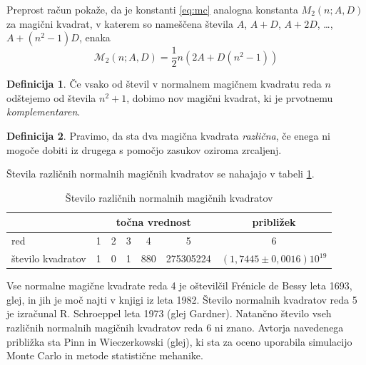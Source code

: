 \documentclass[a4paper,12pt]{article}
\theoremstyle{definition}
\newtheorem{definicija}{Definicija}
\theoremstyle{plain}
\begin{document}
Preprost račun pokaže, da je konstanti \eqref{eq:mc} analogna konstanta
\(M_2(n;A,D)\) za magični kvadrat, v katerem so nameščena števila
\(A\), \(A+D\), \(A+2D\), \ldots, \(A+(n^2-1)D\), enaka %
\[\mathcal{M}_2(n;A,D)=\frac{1}{2}n(2A+D(n^2-1))\]

      
      \begin{definicija}
         Če vsako od števil v normalnem magičnem kvadratu reda \(n\) odštejemo
         od števila \(n^2+1\), dobimo nov magični kvadrat, ki je prvotnemu
         \emph{komplementaren}.
      \end{definicija}

      
      \begin{definicija}
         Pravimo, da sta dva magična kvadrata \emph{različna}, če enega ni mogoče dobiti
         iz drugega s pomočjo zasukov oziroma zrcaljenj.
      \end{definicija}

Števila različnih normalnih magičnih kvadratov se nahajajo v tabeli \ref{table:stevila}.


\begin{table}[!ht]
\centering
\caption{Število različnih normalnih magičnih kvadratov}
\label{table:stevila}

\begin{tabular}{lcccccc}\toprule
  & \multicolumn{5}{c}{točna vrednost} & približek \\\midrule
         red &  1 & 2 & 3 & 4 & 5 & 6  \\
         število kvadratov& 1 & 0 & 1 & 880 & 275305224 & $(1{,}7445 \pm 0{,}0016)10^{19}$ \\
\bottomrule
 \end{tabular}
\end{table}

Vse normalne magične kvadrate reda 4 je oštevilčil Frénicle de Bessy
leta 1693, glej\cite{bessy}, in jih je moč najti v knjigi\cite{berlekamp}
iz leta 1982. Število normalnih kvadratov reda 5 je izračunal
R. Schroeppel leta 1973 (glej Gardner\cite{gardner}).
Natančno število vseh različnih normalnih magičnih kvadratov reda 6 ni znano.
Avtorja navedenega približka sta Pinn in Wieczerkowski (glej\cite{pinn}), ki
sta za oceno uporabila simulacijo Monte Carlo in metode statistične mehanike.


\newpage




\end{document}
